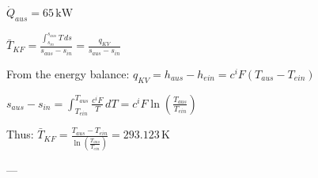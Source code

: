 \( \dot{Q}_{aus} = 65 \, \text{kW} \)  

\( \bar{T}_{KF} = \frac{\int_{s_{in}}^{s_{aus}} T \, ds}{s_{aus} - s_{in}} = \frac{q_{KV}}{s_{aus} - s_{in}} \)  

From the energy balance:  
\( q_{KV} = h_{aus} - h_{ein} = c^i F (T_{aus} - T_{ein}) \)  

\( s_{aus} - s_{in} = \int_{T_{ein}}^{T_{aus}} \frac{c^i F}{T} \, dT = c^i F \ln \left( \frac{T_{aus}}{T_{ein}} \right) \)  

Thus:  
\( \bar{T}_{KF} = \frac{T_{aus} - T_{ein}}{\ln \left( \frac{T_{aus}}{T_{ein}} \right)} = 293.123 \, \text{K} \)  

---
